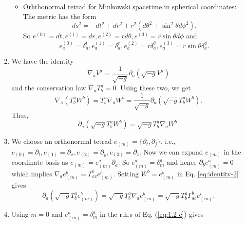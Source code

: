 \documentclass[10pt]{article}
\begin{document}
\begin{enumerate}
\begin{itemize}
  \item \underline{Orhthonormal tetrad for Minkowski spacetime in spherical coordinates:} The metric has the form
    \begin{equation}
      \label{eq:minkowski-spherical}
      ds^2 = -dt^2 + dr^2 + r^2(d\theta^2 + \sin^2\theta d\phi^2).
    \end{equation}
    So $e^{(0)} = dt, e^{(1)} = dr, e^{(2)} = rd\theta, e^{(3)} = r\sin\theta d\phi$ and
    \begin{equation}
      \label{eq:orthonormal-tetrad-minkowski-spherical}
      \boxed{e^{(0)}_a = \delta^t_a, e^{(1)}_a = \delta^r_a, e^{(2)}_a = r \delta^\theta_a, e^{(3)}_a = r\sin\theta \delta^\phi_a}.
    \end{equation}
  \end{itemize}
\item We have the identity
  \begin{equation}
    \label{eq:identity-1}
    \nabla_a V^a = \frac{1}{\sqrt{-g}}\partial_a\left(\sqrt{-g}V^a\right)
  \end{equation}
  and the conservation law $\nabla_a T^a_b=0$. Using these two, we get
  \begin{equation}
    \label{eq:1.2-a}
    \nabla_a\left(T^a_b W^b\right) = T^a_b \nabla_aW^b = \frac{1}{\sqrt{-g}} \partial_a (\sqrt{-g}T^a_b W^b).
  \end{equation}
  Thus,
  \begin{equation}
    \label{eq:identity-2}
    \boxed{\partial_a(\sqrt{-g}T^a_b W^b) = \sqrt{-g}T^a_b \nabla_a W^b}.
  \end{equation}
\item We choose an orthonormal tetrad $e_{(m)} = \{\partial_t, \partial_j\}$, i.e., $e_{(0)} = \partial_t, e_{(1)} = \partial_x, e_{(2)} = \partial_y, e_{(2)} = \partial_z$. Now we can expand $e_{(m)}$ in the coordinate basis as $e_{(m)} = e^a_{(m)} \partial_a$. So $e^a_{(m)} = \delta^{a}_m$ and hence $\partial_b e^a_{(m)} = 0$ which implies $\nabla_a e^b_{(m)} = \Gamma^b_{ac} e^c_{(m)}$. Setting $W^b = e^b_{(m)}$ in Eq. \ref{eq:identity-2} gives
  \begin{equation}
    \label{eq:1.2-c}
    \boxed{\partial_a(\sqrt{-g}T^a_b e^b_{(m)}) = \sqrt{-g}T^a_b \nabla_a e^b_{(m)} = \sqrt{-g}T^a_b \Gamma^b_{ac}e^c_{(m)}}.
  \end{equation}
\item Using $m=0$ and  $e^a_{(m)} = \delta^a_m$ in the r.h.s of Eq. (\ref{eq:1.2-c}) gives
  \begin{equation}

\end{equation}
\end{enumerate}
\end{document}
